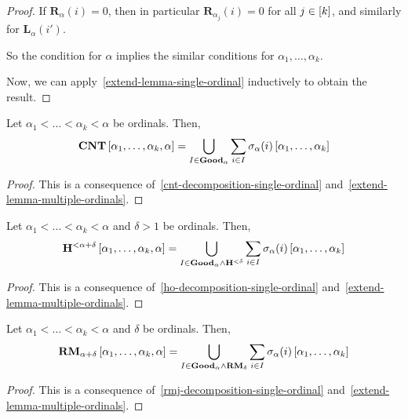 \begin{proof}
  If $\mathbf{R}_\alpha(i) = 0$, then in particular
  $\mathbf{R}_{\alpha_j}(i) = 0$ for all $j \in \left[ {k} \right]$,
  and similarly for $\mathbf{L}_\alpha(i')$.

  So the condition for $\alpha$ implies
  the similar conditions for $\alpha_1, \ldots, \alpha_k$.

  Now, we can apply~\cref{extend-lemma-single-ordinal} inductively
  to obtain the result.
\end{proof}

\begin{lemma}\label{cnt-decomposition-multiple-ordinals}
  Let $\alpha_1 < \ldots < \alpha_k < \alpha$ be ordinals. Then,
  \[
    \mathbf{CNT} \left[ {\alpha_1, \ldots, \alpha_k, \alpha} \right]
    = \bigcup_{I \in \mathbf{Good}_{\alpha}} \sum_{i \in I} \sigma_{\alpha}(i) \left[ {\alpha_1, \ldots, \alpha_k} \right]
  \]
\end{lemma}

\begin{proof}
  This is a consequence of~\cref{cnt-decomposition-single-ordinal}
  and~\cref{extend-lemma-multiple-ordinals}.
\end{proof}

\begin{lemma}\label{ho-decomposition-multiple-ordinals}
  Let $\alpha_1 < \ldots < \alpha_k < \alpha$ and $\delta > 1$ be ordinals. Then,
  \[
    \mathbf{H}^{< \alpha + \delta} \left[ {\alpha_1, \ldots, \alpha_k, \alpha} \right]
    = \bigcup_{I \in \mathbf{Good}_{\alpha} \wedge \mathbf{H}^{< \delta}}
    \sum_{i \in I} \sigma_{\alpha}(i) \left[ {\alpha_1, \ldots, \alpha_k} \right]
  \]
\end{lemma}

\begin{proof}
  This is a consequence of~\cref{ho-decomposition-single-ordinal}
  and~\cref{extend-lemma-multiple-ordinals}.
\end{proof}

\begin{lemma}\label{rmj-decomposition-multiple-ordinals}
  Let $\alpha_1 < \ldots < \alpha_k < \alpha$ and $\delta$ be ordinals.
  Then,
  \[
    \mathbf{RM}_{\alpha + \delta} \left[ {\alpha_1, \ldots, \alpha_k, \alpha} \right]
    = \bigcup_{I \in \mathbf{Good}_{\alpha} \wedge \mathbf{RM}_{\delta}}
    \sum_{i \in I} \sigma_{\alpha}(i) \left[ {\alpha_1, \ldots, \alpha_k} \right]
  \]
\end{lemma}

\begin{proof}
  This is a consequence of~\cref{rmj-decomposition-single-ordinal}
  and~\cref{extend-lemma-multiple-ordinals}.
\end{proof}


